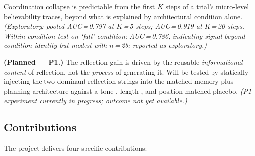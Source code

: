 \documentclass[11pt]{article}
\begin{document}
\begin{description}[leftmargin=1.4cm, style=nextline]
    \item[H7] Coordination collapse is predictable from the first $K$ steps of a trial's micro-level believability traces, beyond what is explained by architectural condition alone. \emph{(Exploratory: pooled AUC\,=\,0.797 at $K$\,=\,5 steps; AUC\,=\,0.919 at $K$\,=\,20 steps. Within-condition test on `full' condition: AUC\,=\,0.786, indicating signal beyond condition identity but modest with $n$\,=\,20; reported as exploratory.)}

    \item[H8] \textbf{(Planned --- P1.)} The reflection gain is driven by the reusable \emph{informational content} of reflection, not the \emph{process} of generating it. Will be tested by statically injecting the two dominant reflection strings into the matched memory-plus-planning architecture against a tone-, length-, and position-matched placebo. \emph{(P1 experiment currently in progress; outcome not yet available.)}
\end{description}

\subsection{Contributions}

The project delivers four specific contributions:
\end{document}
